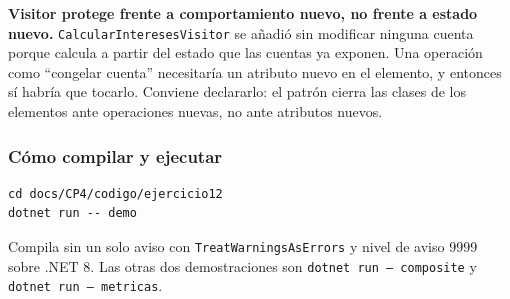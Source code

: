 \textbf{Visitor protege frente a comportamiento nuevo, no frente a estado nuevo.}
\texttt{CalcularInteresesVisitor} se añadió sin modificar ninguna cuenta porque calcula a
partir del estado que las cuentas ya exponen. Una operación como ``congelar cuenta''
necesitaría un atributo nuevo en el elemento, y entonces sí habría que tocarlo. Conviene
declararlo: el patrón cierra las clases de los elementos ante operaciones nuevas, no ante
atributos nuevos.

\subsubsection*{Cómo compilar y ejecutar}

{\small
\begin{verbatim}
cd docs/CP4/codigo/ejercicio12
dotnet run -- demo
\end{verbatim}
}

Compila sin un solo aviso con \texttt{TreatWarningsAsErrors} y nivel de aviso 9999 sobre
.NET 8. Las otras dos demostraciones son \texttt{dotnet run -- composite} y
\texttt{dotnet run -- metricas}.

\fussy
